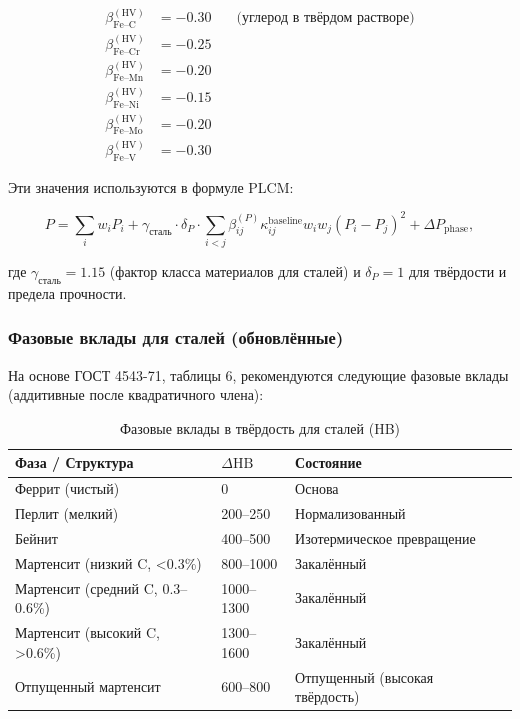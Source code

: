 \documentclass[12pt,a4paper]{article}
\begin{document}
	\[
	\begin{aligned}
		\beta_{\text{Fe–C}}^{(\text{HV})} &= -0.30 \quad &\text{(углерод в твёрдом растворе)} \\
		\beta_{\text{Fe–Cr}}^{(\text{HV})} &= -0.25 \\
		\beta_{\text{Fe–Mn}}^{(\text{HV})} &= -0.20 \\
		\beta_{\text{Fe–Ni}}^{(\text{HV})} &= -0.15 \\
		\beta_{\text{Fe–Mo}}^{(\text{HV})} &= -0.20 \\
		\beta_{\text{Fe–V}}^{(\text{HV})} &= -0.30
	\end{aligned}
	\]
	
	Эти значения используются в формуле PLCM:
	
	\[
	P = \sum_i w_i P_i + \gamma_{\text{сталь}} \cdot \delta_P \cdot \sum_{i<j} \beta_{ij}^{(P)} \kappa_{ij}^{\text{baseline}} w_i w_j (P_i - P_j)^2 + \Delta P_{\text{phase}},
	\]
	
	где $\gamma_{\text{сталь}} = 1.15$ (фактор класса материалов для сталей) и $\delta_P = 1$ для твёрдости и предела прочности.
	
	\subsubsection{Фазовые вклады для сталей (обновлённые)}
	На основе ГОСТ 4543-71, таблицы 6, рекомендуются следующие фазовые вклады (аддитивные после квадратичного члена):
	
	\begin{longtable}{p{3.5cm} p{3.0cm} p{3.0cm} p{4cm}}
		\caption{Фазовые вклады в твёрдость для сталей (HB)}\label{tab:steel_phase_contrib_gost4543}\\
		\toprule
		\textbf{Фаза / Структура} & $\Delta\text{HB}$ & \textbf{Состояние} \\
		\midrule
		Феррит (чистый) & 0 & Основа \\
		Перлит (мелкий) & 200–250 & Нормализованный \\
		Бейнит & 400–500 & Изотермическое превращение \\
		Мартенсит (низкий C, <0.3\%) & 800–1000 & Закалённый \\
		Мартенсит (средний C, 0.3–0.6\%) & 1000–1300 & Закалённый \\
		Мартенсит (высокий C, >0.6\%) & 1300–1600 & Закалённый \\
		Отпущенный мартенсит & 600–800 & Отпущенный (высокая твёрдость) \\
		\bottomrule
	\end{longtable}
	
\end{document}
